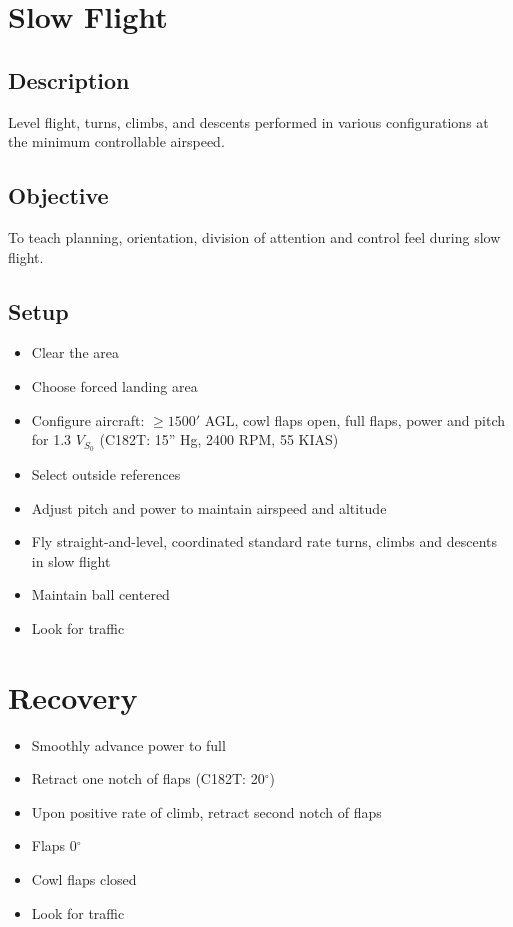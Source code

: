 \section{Slow Flight}

\subsection{Description}

Level flight, turns, climbs, and descents performed in various configurations
at the minimum controllable airspeed.

\subsection{Objective}

To teach planning, orientation, division of attention and control feel during
slow flight.

\subsection{Setup}

\begin{itemize}
  \item Clear the area
  \item Choose forced landing area 
  \item Configure aircraft: $\geq 1500'$ AGL, cowl flaps open, full flaps,
    power and pitch for 1.3 $V_{S_0}$ (C182T: 15'' Hg, 2400 RPM, 55 KIAS)
  \item Select outside references 
  \item Adjust pitch and power to maintain airspeed and altitude 
  \item Fly straight-and-level, coordinated standard rate turns, climbs and
    descents in slow flight
  \item Maintain ball centered
  \item Look for traffic
\end{itemize}

\section{Recovery}

\begin{itemize}
  \item Smoothly advance power to full
  \item Retract one notch of flaps (C182T: 20$^\circ$)
  \item Upon positive rate of climb, retract second notch of flaps
  \item Flaps 0$^\circ$
  \item Cowl flaps closed
  \item Look for traffic
\end{itemize}

